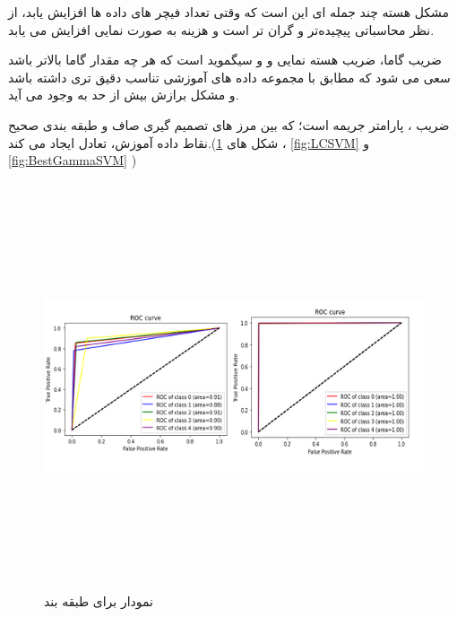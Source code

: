 \documentclass[12pt,onecolumn,a4paper]{article}
\begin{document}
مشکل هسته چند جمله ای این است که وقتی تعداد فیچر های داده ها افزایش یابد، از نظر محاسباتی پیچیده‌تر و گران تر است و هزینه به صورت نمایی افزایش می یابد.

ضریب گاما، ضریب هسته نمایی و  و سیگموید است که هر چه مقدار گاما بالاتر باشد سعی می شود که مطابق با مجموعه داده های آموزشی تناسب دقیق تری داشته باشد و مشکل  برازش بیش از حد به وجود می آید.

ضریب ، پارامتر جریمه  است؛ که بین مرز های تصمیم گیری صاف و طبقه بندی صحیح نقاط داده آموزش، تعادل ایجاد می کند.(شکل های \ref{fig:ROCSVM} ، \ref{fig:LCSVM} و \ref{fig:BestGammaSVM} )

\begin{figure}
  \centering
  \includegraphics[width=15cm,height=12cm,keepaspectratio]{12.png}
  \caption{نمودار  برای طبقه بند }
  \label{fig:ROCSVM}
\end{figure}
\end{document}
